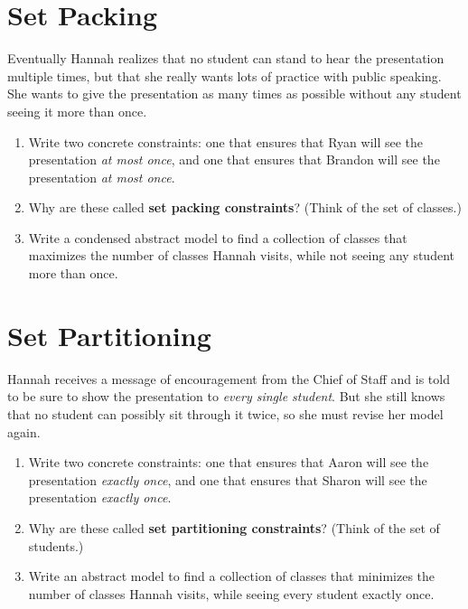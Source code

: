 \documentclass[11pt]{article}
\theoremstyle{definition}
\begin{document}
\newpage
\section{Set Packing}
Eventually Hannah realizes that no student can stand to hear the presentation multiple times, but that she really wants lots of practice with public speaking.  She wants to give the presentation as many times as possible without any student seeing it more than once.
\begin{enumerate}

\item Write two concrete constraints:  one that ensures that Ryan will see the presentation \emph{at most once}, and one that ensures that Brandon will see the presentation \emph{at most once}.

\vspace{2in}

\item Why are these called {\bf set packing constraints}?  (Think of the set of classes.)
\vspace{0.5in}
\item  Write a condensed abstract model to find a collection of classes that maximizes the number of classes Hannah visits, while not seeing any student more than once. 
\vfill
\vfill
\end{enumerate}

\newpage
\section{Set Partitioning}
Hannah receives a message of encouragement from the Chief of Staff and is told to be sure to show the presentation to \emph{every single student}.  But she still knows that no student can possibly sit through it twice, so she must revise her model again.  
\begin{enumerate}
\item Write two concrete constraints:  one that ensures that Aaron will see the presentation \emph{exactly once}, and one that ensures that Sharon will see the presentation \emph{exactly once}.

\vspace{2in}

\item Why are these called {\bf set partitioning constraints}?  (Think of the set of students.) \vspace{0.5in}
\item  Write an abstract model to find a collection of classes that minimizes the number of classes Hannah visits, while seeing every student exactly once. 

\end{enumerate}
\end{document}

